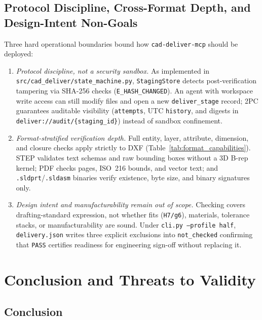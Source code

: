 \documentclass[nocopyright,nolists,upint,varvw,hyphenate]{asmejour}
\begin{document}
\subsection{Protocol Discipline, Cross-Format Depth, and Design-Intent Non-Goals}\label{sec:protocol_boundaries}

Three hard operational boundaries bound how \texttt{cad-deliver-mcp} should be deployed:

\begin{enumerate}
\item \emph{Protocol discipline, not a security sandbox.} As implemented in \texttt{src/cad\_deliver/state\_machine.py}, \texttt{StagingStore} detects post-verification tampering via SHA-256 checks (\texttt{E\_HASH\_CHANGED}). An agent with workspace write access can still modify files and open a new \texttt{deliver\_stage} record; 2PC guarantees auditable visibility (\texttt{attempts}, UTC \texttt{history}, and digests in \texttt{deliver://audit/\{staging\_id\}}) instead of sandbox confinement.
\item \emph{Format-stratified verification depth.} Full entity, layer, attribute, dimension, and closure checks apply strictly to DXF (Table~\ref{tab:format_capabilities}). STEP validates text schemas and raw bounding boxes without a 3D B-rep kernel; PDF checks pages, ISO~216 bounds, and vector text; and \texttt{.sldprt}/\texttt{.sldasm} binaries verify existence, byte size, and binary signatures only.
\item \emph{Design intent and manufacturability remain out of scope.} Checking covers drafting-standard expression, not whether fits (\texttt{H7/g6}), materials, tolerance stacks, or manufacturability are sound. Under \texttt{cli.py --profile half}, \texttt{delivery.json} writes three explicit exclusions into \texttt{not\_checked} confirming that \texttt{PASS} certifies readiness for engineering sign-off without replacing it.
\end{enumerate}

\section{Conclusion and Threats to Validity}\label{sec:conclusion}

\subsection{Conclusion}\label{sec:concl_summary}
\end{document}
